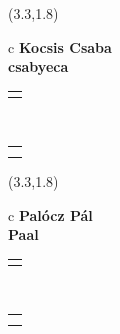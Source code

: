\documentclass[11pt]{article}
\begin{document}
\makebox(3.3,1.8){
  \renewcommand\arraystretch{1.3}
  \begin{tabular}[c]{c}
    \hspace{8.5mm}
    \LARGE\bf{ Kocsis Csaba }\\
    \hspace{8.5mm}
    \Large{ csabyeca }\\
    \renewcommand\arraystretch{3}
    \begin{tabular}[c]{c}
      \centering
      \fontfamily{phv}\selectfont{
        \textbf{
          \textsc{
            \scriptsize{
            \color{Dark}{ Ismerkedő }\color{Bright}{ Webmester }\color{Bright}{ Sminkmester }\color{Bright}{ Programozó }
            }
          }
        }
      }
    \end{tabular}
    \\
    \renewcommand\arraystretch{1}
    \begin{tabular}{p{3.3in}}
      \hspace{.7cm}\\
      \hspace{.7cm}\emph{  }\\
    \end{tabular}
  \end{tabular}
}

\makebox(3.3,1.8){
  \renewcommand\arraystretch{1.3}
  \begin{tabular}[c]{c}
    \hspace{8.5mm}
    \LARGE\bf{ Palócz Pál }\\
    \hspace{8.5mm}
    \Large{ Paal }\\
    \renewcommand\arraystretch{3}
    \begin{tabular}[c]{c}
      \centering
      \fontfamily{phv}\selectfont{
        \textbf{
          \textsc{
            \scriptsize{
            \color{Bright}{ Ismerkedő }\color{Dark}{ Webmester }\color{Dark}{ Sminkmester }\color{Bright}{ Programozó }
            }
          }
        }
      }
    \end{tabular}
    \\
    \renewcommand\arraystretch{1}
    \begin{tabular}{p{3.3in}}
      \hspace{.7cm}\\
      \hspace{.7cm}\emph{  }\\
    \end{tabular}
  \end{tabular}
}
\end{document}
